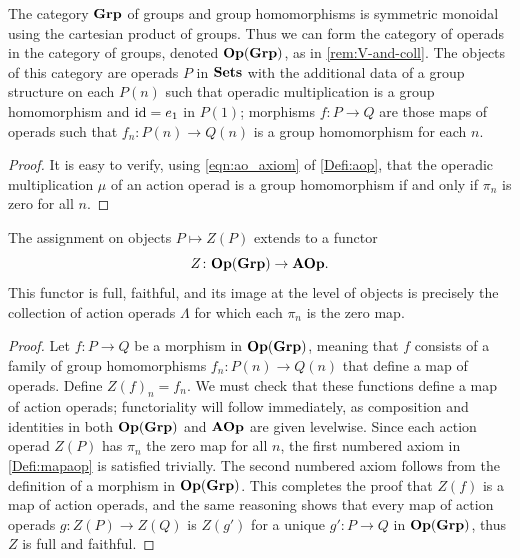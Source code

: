 \begin{rem}\label{rem:op-in-grp}
The category $\mathbf{Grp}$ of groups and group homomorphisms is symmetric monoidal using the cartesian product of groups.
Thus we can form the category of operads in the category of groups, denoted $\mathbf{Op}(\mathbf{Grp})$, as in \cref{rem:V-and-coll}.
The objects of this category are operads $P$ in $\mathbf{Sets}$ with the additional data of a group structure on each $P(n)$ such that operadic multiplication is a group homomorphism and $\textrm{id} = e_1$ in $P(1)$; morphisms $f \colon P \to Q$ are those maps of operads such that $f_n \colon P(n) \to Q(n)$ is a group homomorphism for each $n$.
\end{rem}

\begin{proof}
It is easy to verify, using \cref{eqn:ao_axiom} of \cref{Defi:aop}, that the operadic multiplication $\mu$ of an action operad is a group homomorphism if and only if $\pi_{n}$ is zero for all $n$.
\end{proof}

\begin{prop}\label{prop:Z}
The assignment on objects $P \mapsto Z(P)$ extends to a functor 
\[
Z \colon  \mathbf{Op}(\mathbf{Grp}) \rightarrow \mathbf{AOp}.
\]
This functor is full, faithful, and its image at the level of objects is precisely the collection of action operads $\Lambda$ for which each $\pi_n$ is the zero map.
\end{prop}
\begin{proof}
Let $f \colon P \to Q$ be a morphism in $\mathbf{Op}(\mathbf{Grp})$, meaning that $f$ consists of a family of group homomorphisms $f_n \colon P(n) \to Q(n)$ that define a map of operads.
Define $Z(f)_n = f_n$. We must check that these functions define a map of action operads; functoriality will follow immediately, as composition and identities in both $\mathbf{Op}(\mathbf{Grp})$ and $\mathbf{AOp}$ are given levelwise.
Since each action operad $Z(P)$ has $\pi_n$ the zero map for all $n$, the first numbered axiom in \cref{Defi:mapaop} is satisfied trivially.
The second numbered axiom follows from the definition of a morphism in $\mathbf{Op}(\mathbf{Grp})$.
This completes the proof that $Z(f)$ is a map of action operads, and the same reasoning shows that every map of action operads $g \colon Z(P) \to Z(Q)$ is $Z(g')$ for a unique $g' \colon P \to Q$ in $\mathbf{Op}(\mathbf{Grp})$, thus $Z$ is full and faithful.
\end{proof}

